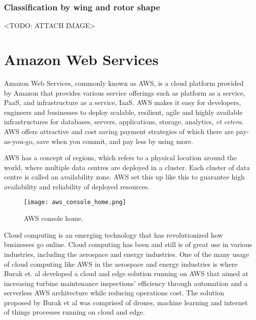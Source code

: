 


\subsubsection*{Classification by wing and rotor shape}

<TODO: ATTACH IMAGE>





\section{Amazon Web Services}
\label{sec:aws}

Amazon Web Services, commonly known as AWS, is a cloud platform provided by Amazon that provides various service offerings such as platform as a service, PaaS, and infrastructure as a service, IaaS\cite{awswhatisaws2022}. AWS makes it easy for developers, engineers and businesses to deploy scalable, resilient, agile and highly available infrastructures for databases, servers, applications, storage, analytics, \textit{et cetera}. AWS offers attractive and cost saving payment strategies of which there are pay-as-you-go, save when you commit, and pay less by using more\cite{awspricing2022}.

AWS has a concept of regions, which refers to a physical location around the world, where multiple data centres are deployed in a cluster. Each cluster of data centre is called an availability zone\cite{awsregionsandazs}. AWS set this up like this to guarantee high availability and reliability of deployed resources.

\begin{figure}[H]
    \centering \texttt{[image: aws\_console\_home.png]}
    \caption{AWS console home.}
    \label{fig:aws-console-home}
\end{figure}

Cloud computing is an emerging technology that has revolutionized how businesses go online. Cloud computing has been and still is of great use in various industries, including the aerospace and energy industries. One of the many usage of cloud computing like AWS in the aerospace and energy industries is where Burak et. al developed a cloud and edge solution running on AWS that aimed at increasing turbine maintenance inspections' efficiency through automation and a serverless AWS architecture while reducing operations cost\cite{burakawswindfarm2021}. The solution proposed by Burak et al was comprised of drones, machine learning and internet of things processes running on cloud and edge.

